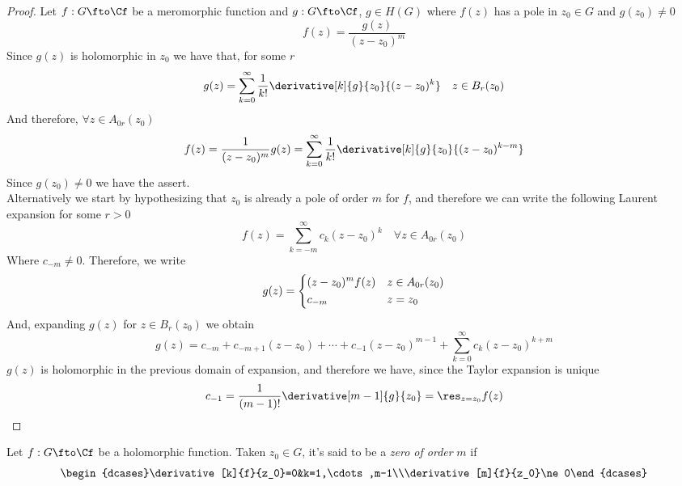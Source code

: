 \documentclass[../mmf.tex]{subfiles}
\begin{document}
\begin{proof}
	Let $f:G\fto\Cf$ be a meromorphic function and $g:G\fto\Cf$, $g\in H(G)$ where $f(z)$ has a pole in $z_0\in G$ and $g(z_0)\ne0$
	\begin{equation*}
		f(z)=\frac{g(z)}{(z-z_0)^m}
	\end{equation*}
	Since $g(z)$ is holomorphic in $z_0$ we have that, for some $r$
	\begin{equation*}
		g(z)=\sum_{k=0}^{\infty}\frac{1}{k!}\derivative[k]{g}{z_0}{(z-z_0)^k}\quad z\in B_r(z_0)
	\end{equation*}
	And therefore, $\forall z\in A_{0r}(z_0)$
	\begin{equation*}
		f(z)=\frac{1}{(z-z_0)^m}g(z)=\sum_{k=0}^{\infty}\frac{1}{k!}\derivative[k]{g}{z_0}{(z-z_0)^{k-m}}
	\end{equation*}
	Since $g(z_0)\ne0$ we have the assert.\\
	Alternatively we start by hypothesizing that $z_0$ is already a pole of order $m$ for $f$, and therefore we can write the following Laurent expansion for some $r>0$
	\begin{equation*}
		f(z)=\sum_{k=-m}^\infty c_k(z-z_0)^k\quad\forall z\in A_{0r}(z_0)
	\end{equation*}
	Where $c_{-m}\ne0$. Therefore, we write
	\begin{equation*}
		g(z)=\begin{dcases}(z-z_0)^mf(z)&z\in A_{0r}(z_0)\\c_{-m}&z=z_0\end{dcases}
	\end{equation*}
	And, expanding $g(z)$ for $z\in B_r(z_0)$ we obtain
	\begin{equation*}
		g(z)=c_{-m}+c_{-m+1}(z-z_0)+\cdots+c_{-1}(z-z_0)^{m-1}+\sum_{k=0}^{\infty}c_k(z-z_0)^{k+m}
	\end{equation*}
	$g(z)$ is holomorphic in the previous domain of expansion, and therefore we have, since the Taylor expansion is unique
	\begin{equation*}
		c_{-1}=\frac{1}{(m-1)!}\derivative[m-1]{g}{z_0}=\res_{z=z_0}f(z)
	\end{equation*}
\end{proof}
\begin{dfn}[Zero]
	Let $f:G\fto\Cf$ be a holomorphic function. Taken $z_0\in G$, it's said to be a \textit{zero of order} $m$ if
	\begin{equation*}
		\begin{dcases}\derivative[k]{f}{z_0}=0&k=1,\cdots,m-1\\\derivative[m]{f}{z_0}\ne0\end{dcases}
	\end{equation*}
\end{dfn}
\end{document}
